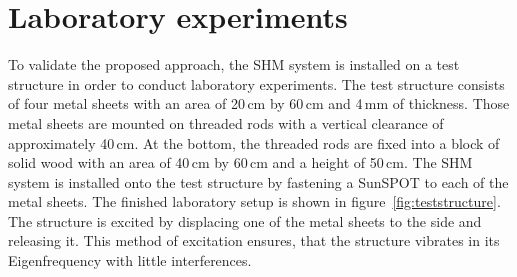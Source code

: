 \documentclass[12pt,a4paper]{scrartcl}
\begin{document}
\newpage
\section*{Laboratory experiments}


To validate the proposed approach, the SHM system is installed on a test structure in order to conduct laboratory experiments.
The test structure consists of four metal sheets with an area of 20\,cm by 60\,cm and 4\,mm of thickness.
Those metal sheets are mounted on threaded rods with a vertical clearance of approximately 40\,cm.
At the bottom, the threaded rods are fixed into a block of solid wood with an area of 40\,cm by 60\,cm and a height of 50\,cm.
The SHM system is installed onto the test structure by fastening a SunSPOT to each of the metal sheets.
The finished laboratory setup is shown in figure~\ref{fig:teststructure}.
The structure is excited by displacing one of the metal sheets to the side and releasing it.
This method of excitation ensures, that the structure vibrates in its Eigenfrequency with little interferences.
\end{document}
